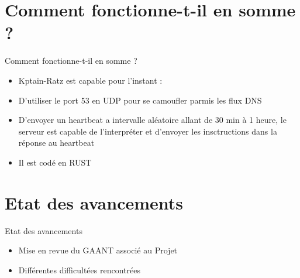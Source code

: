 \documentclass{beamer}
\begin{document}
\section{Comment fonctionne-t-il en somme ?}
  \begin{frame}{Comment fonctionne-t-il en somme ?}
  \begin{itemize}
	\item Kptain-Ratz est capable pour l'instant :
	\newline
	\newline
	\newline
	\item D'utiliser le port 53 en UDP pour se camoufler parmis les flux DNS
	\item D'envoyer un heartbeat a intervalle aléatoire allant de 30 min à 1 heure, le serveur est capable de l'interpréter et d'envoyer les insctructions dans la réponse au heartbeat
	\item Il est codé en RUST
  \end{itemize}
  \end{frame}


\section{Etat des avancements}
  \begin{frame}{Etat des avancements}
  \begin{itemize}
	\item Mise en revue du GAANT associé au Projet 
	\item Différentes difficultées rencontrées
  \end{itemize}
  \end{frame}
\end{document}
